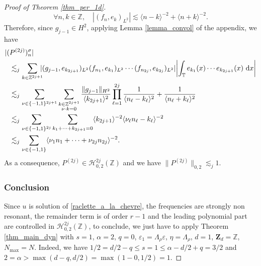 \documentclass[JEP,XML,SOM,Unicode,NoEqCountersInSection,published]{cedram}
\theoremstyle{definition}
\begin{document}
\begin{proof}[Proof of Theorem \ref{thm_per_1d}]
\[
\forall n,k\in \mathbb{Z}, \quad |(f_n,e_k)_{L^2}| \lesssim \langle n-k \rangle^{-2} + \langle n+k \rangle^{-2}.
\]
Therefore, since $g_{j-1}\in H^2$, applying Lemma \ref{lemma_convol} of the appendix, we have
\begin{equation*}
\begin{split}
|(&P^{(2j)})_n^\sigma| \\
&\lesssim_j \sum_{k\in \mathbb{Z}^{2j+1}}\hspace*{-2mm} | (g_{j-1},e_{k_{2j+1}})_{L^2} (f_{n_1},e_{k_1})_{L^2} \cdots (f_{n_{2j}},e_{k_{2j}})_{L^2}| \biggl| \int_{\mathbb{T}} e_{k_1}(x) \cdots e_{k_{2j+1}}(x) \ \mathrm{d}x \biggr| \\
&\lesssim_j \sum_{\nu \in \{-1,1\}^{2j+1}} \sum_{\substack{k\in \mathbb{Z}^{2j+1}\\ \nu \cdot k =0}} \frac{\| g_{j-1} \|_{H^2}}{\langle k_{2j+1} \rangle^2} \prod_{\ell=1}^{2j} \frac1{\langle n_{\ell}-k_{\ell} \rangle^2} + \frac1{\langle n_{\ell}+k_{\ell} \rangle^2} \\
&\lesssim_j \sum_{\nu \in \{-1,1\}^{2j}} \sum_{k_1+\cdots+k_{2j+1}=0} \langle k_{2j+1} \rangle^{-2} \langle \nu_\ell n_{\ell}-k_{\ell} \rangle^{-2} \\
&\lesssim_j \sum_{\nu \in \{-1,1\}} \langle \nu_1 n_1 + \cdots+ \nu_{2j} n_{2j} \rangle^{-2}.
\end{split}
\end{equation*}
As a consequence, $P^{(2j)} \in \mathscr{H}_{0,2}^{2j}(\mathbb{Z})$ and we have $\| P^{(2j)} \|_{0,2} \lesssim_j 1$.

\subsubsection*{Conclusion}
Since $u$ is solution of \eqref{raclette_a_la_chevre}, the frequencies are strongly non resonant, the remainder term is of order $r-1$ and the leading polynomial part are controlled in $\mathscr{H}_{0,2}^{2j}(\mathbb{Z})$, to conclude, we just have to apply Theorem \ref{thm_main_dyn} with $s=1$, $\alpha =2$, $q=0$, $\varepsilon_1 = \Lambda_\rho \varepsilon$, $\eta= \Lambda_{\rho}$, $d=1$, $\mathbf{Z}_d=\mathbb{Z}$, $N_{\max}=N$. Indeed, we have $1/2=d/2-q \leq s=1 \leq \alpha - d/2 +q =3/2 $ and $2=\alpha > \max(d-q,d/2) =\max(1-0,1/2)=1$.
\end{proof}
\end{document}
